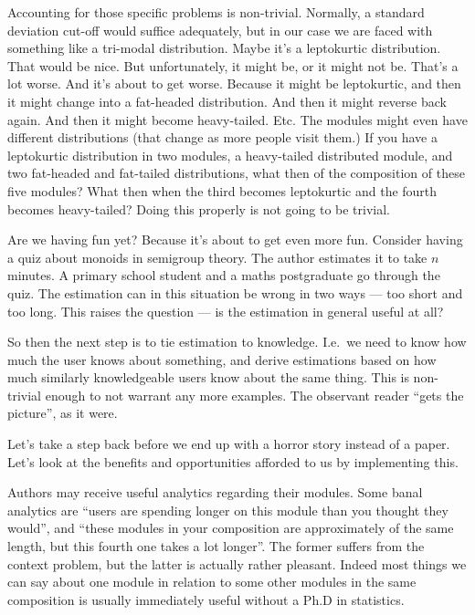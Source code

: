 Accounting for those specific problems is non-trivial. Normally, a standard 
deviation cut-off would suffice adequately, but in our case we are faced with 
something like a tri-modal distribution. Maybe it's a leptokurtic 
distribution. That would be nice. But unfortunately, it might be, or it might 
not be. That's a lot worse. And it's about to get worse. Because it might be 
leptokurtic, and then it might change into a fat-headed distribution. And then 
it might reverse back again. And then it might become heavy-tailed. Etc. The 
modules might even have different distributions (that change as more people 
visit them.) If you have a leptokurtic distribution in two modules, a 
heavy-tailed distributed module, and two fat-headed and fat-tailed 
distributions, what then of the composition of these five modules? What then 
when the third becomes leptokurtic and the fourth becomes heavy-tailed? Doing 
this properly is not going to be trivial.

Are we having fun yet? Because it's about to get even more fun. Consider 
having a quiz about monoids in semigroup theory. The author estimates it to 
take $n$ minutes. A primary school student and a maths postgraduate go through 
the quiz. The estimation can in this situation be wrong in two ways --- too 
short and too long. This raises the question --- is the estimation in general 
useful at all?

So then the next step is to tie estimation to knowledge. I.e.\ we need to know 
how much the user knows about something, and derive estimations based on how 
much similarly knowledgeable users know about the same thing. This is 
non-trivial enough to not warrant any more examples. The observant reader 
``gets the picture'', as it were.

Let's take a step back before we end up with a horror story instead of a 
paper. Let's look at the benefits and opportunities afforded to us by 
implementing this.

Authors may receive useful analytics regarding their modules. Some banal 
analytics are ``users are spending longer on this module than you thought they 
would'', and ``these modules in your composition are approximately of the same 
length, but this fourth one takes a lot longer''. The former suffers from the 
context problem, but the latter is actually rather pleasant. Indeed most 
things we can say about one module in relation to some other modules in the 
same composition is usually immediately useful without a Ph.D in statistics.

